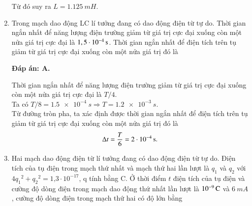 \begin{enumerate}[label=\bfseries Câu \arabic*:]
{		Từ đó suy ra $L = \SI{1,125}{mH}.$
		
	}
	
	
	\item {}
	
	{Trong mạch dao động LC lí tưởng đang có dao động điện từ tự do. Thời gian ngắn nhất để năng lượng điện trường giảm từ giá trị cực đại xuống còn một nửa giá trị cực đại là $\xsi{1,5\cdot10^{-4}}{s}$. Thời gian ngắn nhất để điện tích trên tụ giảm từ giá trị cực đại xuống còn một nửa giá trị đó là
	}
	
	\hideall
	{		\textbf{Đáp án: A.}
		
		Thời gian ngắn nhất để năng lượng điện trường giảm từ giá trị cực đại xuống còn một nửa giá trị cực đại là $T/4$. \\
		Ta có $T/8 = \SI{1,5 e-4}{s} \Rightarrow T = \SI{1,2 e-3}{s}.$ \\ 
		Từ đường tròn pha, ta xác định được thời gian ngắn nhất để điện tích trên tụ giảm từ giá trị cực đại xuống còn một nửa giá trị đó là
		$$
		\Delta t = \dfrac{T}{6} = \xsi{2\cdot10^{-4}}{s}.
		$$	 
	}
	
	\item {}
	
	{Hai mạch dao động điện từ lí tưởng đang có dao động điện từ tự do. Điện tích của tụ điện trong mạch thứ nhất và mạch thứ hai lần lượt là $q_1$ và $q_2$ với $4{q_1}^{2}+{q_2}^{2} = \text{1,3}\cdot10^{-17}$, q tính bằng C. Ở thời điểm $t$ điện tích của tụ điện và cường độ dòng điện trong mạch dao động thứ nhất lần lượt là $\xsi{10^{-9}}{C}$ và $\SI{6}{mA}$, cường độ dòng điện trong mạch thứ hai có độ lớn bằng
	}
	

\end{enumerate}
